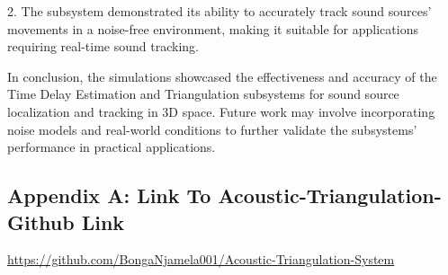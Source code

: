 \documentclass[a4paper,11pt]{article}
\begin{document}
2. The subsystem demonstrated its ability to accurately track sound sources' movements in a noise-free environment, making it suitable for applications requiring real-time sound tracking.

In conclusion, the simulations showcased the effectiveness and accuracy of the Time Delay Estimation and Triangulation subsystems for sound source localization and tracking in 3D space. Future work may involve incorporating noise models and real-world conditions to further validate the subsystems' performance in practical applications.




\clearpage

\subsection*{Appendix A: Link To Acoustic-Triangulation-Github Link}

\url{https://github.com/BongaNjamela001/Acoustic-Triangulation-System}
\end{document}
